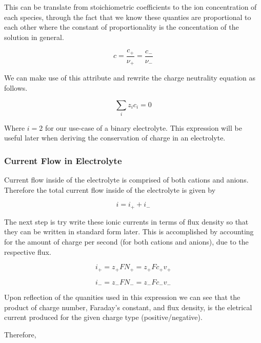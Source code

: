 \documentclass[lettersize,journal]{IEEEtran}
\begin{document}
This can be translate from stoichiometric coefficients to the ion concentration of each species, through the fact that we know these quanties are proportional to each other where the constant of proportionality is the concentation of the solution in general.

\begin{equation}
  c = \frac{c_{+}}{\nu_{+}} = \frac{c_{-}}{\nu_{-}}
\end{equation}

We can make use of this attribute and rewrite the charge neutrality equation as follows.


\begin{equation}
  \sum_{i} z_i c_i = 0
\end{equation}

Where $ i=2$ for our use-case of a binary electrolyte. This expression will be useful later when deriving the conservation of charge in an electrolyte.

\subsubsection{ Current Flow in Electrolyte }

Current flow inside of the electrolyte is comprised of both cations and anions. Therefore the total current flow inside of the electrolyte is given by

\begin{equation}
  i = i_{+} + i_{-}
\end{equation}

The next step is try write these ionic currents in terms of flux density so that they can be written in standard form later. This is accomplished by accounting for the amount of charge per second (for both cations and anions), due to the respective flux.

\begin{equation}
    i_+ =  z_+ FN_+ = z_{+}Fc_{+}v_{+}
\end{equation}

\begin{equation}
  i_- =  z_- FN_- = z_{-}Fc_{-}v_{-}
\end{equation}

Upon reflection of the quanities used in this expression we can see that the product of charge number, Faraday's constant, and flux density, is the eletrical current produced for the given charge type (positive/negative).


Therefore,
\end{document}
